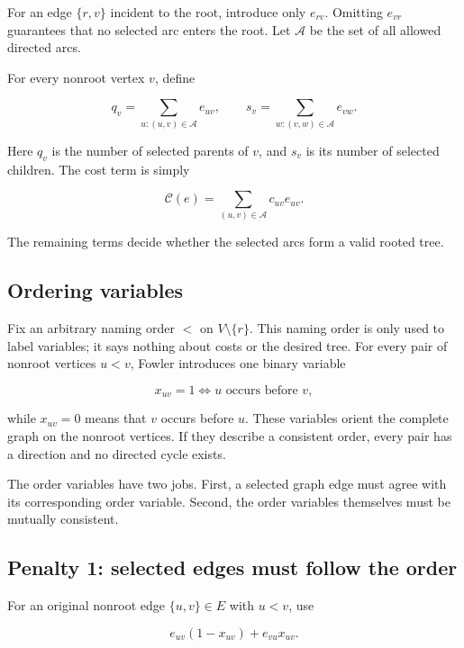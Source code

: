 \documentclass[10pt,a4paper]{article}
\newcommand{\A}{\mathcal A}
\newcommand{\C}{\mathcal C}
\begin{document}
For an edge $\{r,v\}$ incident to the root, introduce only $e_{rv}$. Omitting
$e_{vr}$ guarantees that no selected arc enters the root. Let $\A$ be the set
of all allowed directed arcs.

For every nonroot vertex $v$, define

\begin{equation}
q_v=\sum_{u:(u,v)\in\A}e_{uv},
\qquad
s_v=\sum_{w:(v,w)\in\A}e_{vw}.
\label{eq:q-s}
\end{equation}

Here $q_v$ is the number of selected parents of $v$, and $s_v$ is its number
of selected children. The cost term is simply

\begin{equation}
\C(e)=\sum_{(u,v)\in\A}c_{uv}e_{uv}.
\label{eq:cost}
\end{equation}

The remaining terms decide whether the selected arcs form a valid rooted tree.

\subsection{Ordering variables}

Fix an arbitrary naming order $<$ on $V\setminus\{r\}$. This naming order is
only used to label variables; it says nothing about costs or the desired tree.
For every pair of nonroot vertices $u<v$, Fowler introduces one binary variable

\[
x_{uv}=1 \Longleftrightarrow u \text{ occurs before } v,
\]

while $x_{uv}=0$ means that $v$ occurs before $u$. These variables orient the
complete graph on the nonroot vertices. If they describe a consistent order,
every pair has a direction and no directed cycle exists.

The order variables have two jobs. First, a selected graph edge must agree
with its corresponding order variable. Second, the order variables themselves
must be mutually consistent.

\subsection{Penalty 1: selected edges must follow the order}

For an original nonroot edge $\{u,v\}\in E$ with $u<v$, use

\begin{equation}
e_{uv}(1-x_{uv})+e_{vu}x_{uv}.
\label{eq:single-edge-order}
\end{equation}
\end{document}
